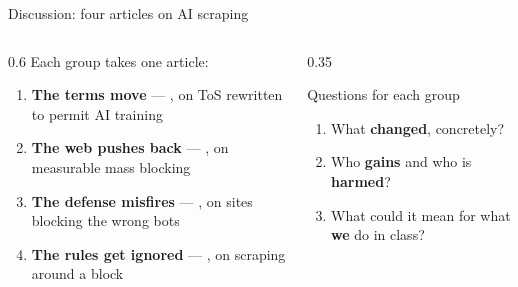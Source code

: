 \documentclass[9pt,aspectratio=169]{beamer}
\begin{document}
\begin{frame}{Discussion: four articles on AI scraping}
    \begin{columns}[T]
        \begin{column}{0.6\textwidth}
            Each group takes one article:
            \begin{enumerate}
                \item \textbf{The terms move} --- \textcite{tan_terms_2024}, on ToS rewritten to permit AI training
                \item \textbf{The web pushes back} --- \textcite{koebler_backlash_2024}, on measurable mass blocking
                \item \textbf{The defense misfires} --- \textcite{koebler_wrong_2024}, on sites blocking the wrong bots
                \item \textbf{The rules get ignored} --- \textcite{mehrotra_perplexity_2024}, on scraping around a block
            \end{enumerate}
        \end{column}
        \begin{column}{0.35\textwidth}
            \begin{block}{Questions for each group}
                \footnotesize
                \begin{enumerate}\footnotesize
                    \item What \textbf{changed}, concretely?
                    \item Who \textbf{gains} and who is \textbf{harmed}?
                    \item What could it mean for what \textbf{we} do in class?
                \end{enumerate}
            \end{block}
        \end{column}
    \end{columns}
\end{frame}
\end{document}
